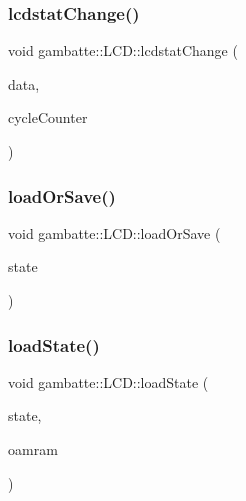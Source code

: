 \subsubsection{\texorpdfstring{lcdstat\+Change()}{lcdstatChange()}}
{\footnotesize\ttfamily void gambatte\+::\+L\+C\+D\+::lcdstat\+Change (\begin{DoxyParamCaption}\item[{unsigned}]{data,  }\item[{unsigned}]{cycle\+Counter }\end{DoxyParamCaption})}

\mbox{\label{classgambatte_1_1LCD_a516d73f82da6e3908ac8a9fc6899effc}} 
\subsubsection{\texorpdfstring{load\+Or\+Save()}{loadOrSave()}}
{\footnotesize\ttfamily void gambatte\+::\+L\+C\+D\+::load\+Or\+Save (\begin{DoxyParamCaption}\item[{\hyperlink{classgambatte_1_1loadsave}{loadsave} \&}]{state }\end{DoxyParamCaption})}

\mbox{\label{classgambatte_1_1LCD_a9cd3dc21fda725807416ef6b48535f07}} 
\subsubsection{\texorpdfstring{load\+State()}{loadState()}}
{\footnotesize\ttfamily void gambatte\+::\+L\+C\+D\+::load\+State (\begin{DoxyParamCaption}\item[{\hyperlink{structgambatte_1_1SaveState}{Save\+State} const \&}]{state,  }\item[{unsigned char const $\ast$}]{oamram }\end{DoxyParamCaption})}

\mbox{\label{classgambatte_1_1LCD_a92e048c713983a217e35060dd8f50556}} 
